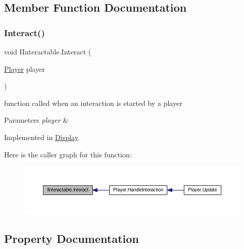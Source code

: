 \subsection{Member Function Documentation}
\mbox{\label{interface_i_interactable_a736e28381ac0e7ca60f5fae2feb95afe}} 
\subsubsection{\texorpdfstring{Interact()}{Interact()}}
{\footnotesize\ttfamily void I\+Interactable.\+Interact (\begin{DoxyParamCaption}\item[{\mbox{\hyperlink{class_player}{Player}}}]{player }\end{DoxyParamCaption})}



function called when an interaction is started by a player 


\begin{DoxyParams}{Parameters}
{\em player} & \\
\hline
\end{DoxyParams}


Implemented in \mbox{\hyperlink{class_display_a43fc2a6f19bbf2f1bdb676392b37e921}{Display}}.

Here is the caller graph for this function\+:
\nopagebreak
\begin{figure}[H]
\begin{center}
\leavevmode
\includegraphics[width=350pt]{interface_i_interactable_a736e28381ac0e7ca60f5fae2feb95afe_icgraph}
\end{center}
\end{figure}


\subsection{Property Documentation}
\mbox{\label{interface_i_interactable_a1ea155218acad8d933577fa071de48af}} 
